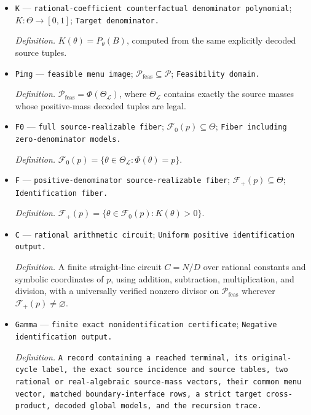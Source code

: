 \documentclass{article}
\begin{document}
\begin{itemize}
  \item \texttt{K} --- \texttt{rational-\allowbreak{}coefficient counterfactual denominator polynomial}; \(K:\Theta\to[0,1]\); \texttt{Target denominator.}
  \par\smallskip\noindent\emph{Definition.} \(K(\theta)=P_\theta(B)\), computed from the same explicitly decoded source tuples.
  \item \texttt{Pimg} --- \texttt{feasible menu image}; \(\mathcal P_{\mathrm{feas}}\subseteq\mathcal P\); \texttt{Feasibility domain.}
  \par\smallskip\noindent\emph{Definition.} \(\mathcal P_{\mathrm{feas}}=\Phi(\Theta_{\mathcal L})\), where \(\Theta_{\mathcal L}\) contains exactly the source masses whose positive-mass decoded tuples are legal.
  \item \texttt{F0} --- \texttt{full source-\allowbreak{}realizable fiber}; \(\mathcal F_0(p)\subseteq\Theta\); \texttt{Fiber including zero-\allowbreak{}denominator models.}
  \par\smallskip\noindent\emph{Definition.} \(\mathcal F_0(p)=\{\theta\in\Theta_{\mathcal L}:\Phi(\theta)=p\}\).
  \item \texttt{F} --- \texttt{positive-\allowbreak{}denominator source-\allowbreak{}realizable fiber}; \(\mathcal F_+(p)\subseteq\Theta\); \texttt{Identification fiber.}
  \par\smallskip\noindent\emph{Definition.} \(\mathcal F_+(p)=\{\theta\in\mathcal F_0(p):K(\theta)>0\}\).
  \item \texttt{C} --- \texttt{rational arithmetic circuit}; \texttt{Uniform positive identification output.}
  \par\smallskip\noindent\emph{Definition.} A finite straight-line circuit \(C=N/D\) over rational constants and symbolic coordinates of \(p\), using addition, subtraction, multiplication, and division, with a universally verified nonzero divisor on \(\mathcal P_{\mathrm{feas}}\) wherever \(\mathcal F_+(p)\neq\varnothing\).
  \item \texttt{Gamma} --- \texttt{finite exact nonidentification certificate}; \texttt{Negative identification output.}
  \par\smallskip\noindent\emph{Definition.} \texttt{A record containing a reached terminal,\allowbreak{} its original-\allowbreak{}cycle label,\allowbreak{} the exact source incidence and source tables,\allowbreak{} two rational or real-\allowbreak{}algebraic source-\allowbreak{}mass vectors,\allowbreak{} their common menu vector,\allowbreak{} matched boundary-\allowbreak{}interface rows,\allowbreak{} a strict target cross-\allowbreak{}product,\allowbreak{} decoded global models,\allowbreak{} and the recursion trace.}

\end{itemize}
\end{document}
